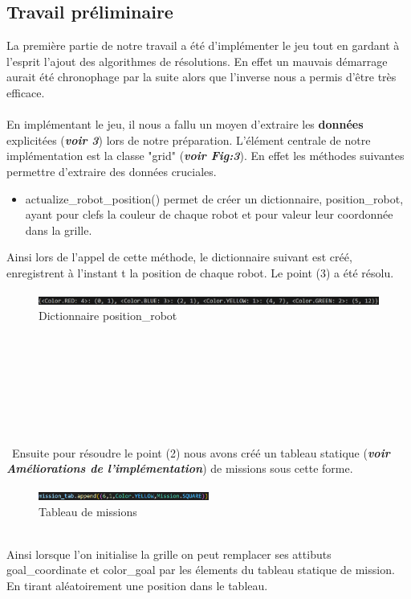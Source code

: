 \documentclass{article}
\begin{document}
\subsection{Travail préliminaire}
La première partie de notre travail a été d'implémenter le jeu tout en gardant à l'esprit l'ajout des algorithmes de résolutions. En effet un mauvais démarrage aurait été chronophage par la suite alors que l'inverse nous a permis d'être très efficace.\\\\
En implémentant le jeu, il nous a fallu un moyen d'extraire les \textbf{données} explicitées (\textit{\textbf{voir 3}}) lors de notre préparation. L'élément centrale de notre implémentation est la classe "grid" (\textit{\textbf{voir Fig:3}}). En effet les méthodes suivantes permettre d'extraire des données cruciales.
\begin{itemize}
\item actualize\_robot\_position() permet de créer un dictionnaire, position\_robot, ayant pour clefs la couleur de chaque robot et pour valeur leur coordonnée dans la grille. 
\end{itemize}
Ainsi lors de l'appel de cette méthode, le dictionnaire suivant est créé, enregistrent à l'instant t la position de chaque robot. Le point (3) a été résolu.
\begin{figure}[!h]
  \centering  
  \includegraphics[width=1\textwidth]{dict_pos.png}  
  \caption{Dictionnaire position\_robot} 
  \label{fig:Dict}  
\end{figure}\\\\\\\\\\\\\\\
Ensuite pour résoudre le point (2) nous avons créé un tableau statique (\textit{\textbf{voir Améliorations de l'implémentation}}) de missions sous cette forme.
\begin{figure}[htbp]
  \centering  
  \includegraphics[width=0.5\textwidth]{mission.png}  
  \caption{Tableau de missions} 
  \label{fig:Mission}  
\end{figure}\\
Ainsi lorsque l'on initialise la grille on peut remplacer ses attibuts goal\_coordinate et color\_goal par les élements du tableau statique de mission. En tirant aléatoirement une position dans le tableau.\\\\
\end{document}
